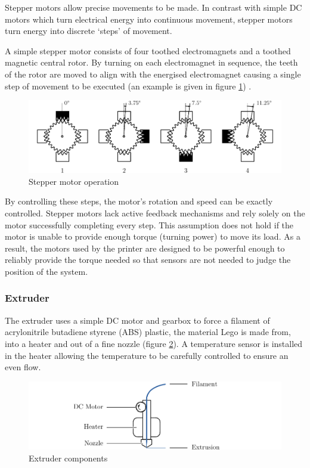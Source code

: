				Stepper motors allow precise movements to be made. In contrast with
				simple DC motors which turn electrical energy into continuous movement,
				stepper motors turn energy into discrete `steps' of movement.
				
				A simple stepper motor consists of four toothed electromagnets and a
				toothed magnetic central rotor. By turning on each electromagnet in
				sequence, the teeth of the rotor are moved to align with the energised
				electromagnet causing a single step of movement to be executed (an
				example is given in figure \ref{fig:stepperMotor}) \cite{steppers101}.
				
				\begin{figure}
					\includegraphics[width=1\textwidth]{diagrams/stepperMotor.pdf}
					\caption{Stepper motor operation}
					\label{fig:stepperMotor}
				\end{figure}
				
				By controlling these steps, the motor's rotation and speed can be
				exactly controlled. Stepper motors lack active feedback mechanisms and
				rely solely on the motor successfully completing every step. This
				assumption does not hold if the motor is unable to provide enough torque
				(turning power) to move its load. As a result, the motors used by the
				printer are designed to be powerful enough to reliably provide the
				torque needed so that sensors are not needed to judge the position of
				the system.
				
			\subsubsection{Extruder}
				
				The extruder uses a simple DC motor and gearbox to force a filament of
				acrylonitrile butadiene styrene (ABS) plastic, the material Lego is made
				from, into a heater and out of a fine nozzle (figure \ref{fig:extruder}).
				A temperature sensor is installed in the heater allowing the temperature
				to be carefully controlled to ensure an even flow.
				
				\begin{figure}
					\includegraphics[width=1\textwidth]{diagrams/extruder.pdf}
					\caption{Extruder components}
					\label{fig:extruder}
				\end{figure}
				

